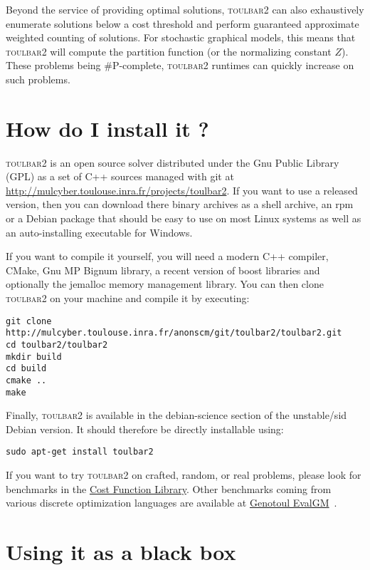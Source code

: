 \documentclass{article}
\def\toulbar2{\textsc{toulbar2}}
\begin{document}
Beyond the service of providing optimal solutions, \toulbar2 can also
exhaustively enumerate solutions below a cost threshold and
perform guaranteed approximate weighted counting of solutions. For
stochastic graphical models, this means that \toulbar2 will compute
the partition function (or the normalizing constant $Z$). These
problems being \#P-complete, \toulbar2 runtimes can quickly increase
on such problems.

\section{How do I install it ?}


\toulbar2 is an open source solver distributed under the Gnu Public
Library (GPL) as a set of C++ sources managed with git at
\url{http://mulcyber.toulouse.inra.fr/projects/toulbar2}. If you want
to use a released version, then you can download there binary archives
as a shell archive, an rpm or a Debian package that should be easy to
use on most Linux systems as well as an auto-installing executable for
Windows.

If you want to compile it yourself, you will need a modern C++
compiler, CMake, Gnu MP Bignum library, a recent version of boost
libraries and optionally the jemalloc memory management library. You
can then clone \toulbar2 on your machine and compile it by executing:

\begin{verbatim}
git clone http://mulcyber.toulouse.inra.fr/anonscm/git/toulbar2/toulbar2.git
cd toulbar2/toulbar2
mkdir build
cd build
cmake ..
make
\end{verbatim}

Finally, \toulbar2 is available in the debian-science
section of the unstable/sid Debian version. It should therefore be
directly installable using:

\begin{verbatim}
sudo apt-get install toulbar2
\end{verbatim}

If you want to try \toulbar2 on crafted, random, or real problems,
please look for benchmarks in the
\href{https://mulcyber.toulouse.inra.fr/projects/costfunctionlib}{Cost
  Function Library}. Other benchmarks coming from various discrete optimization languages are available at \href{http://genoweb.toulouse.inra.fr/~degivry/evalgm}{Genotoul EvalGM}~\cite{Hurley16b}.

\section{Using it as a black box}
\end{document}
